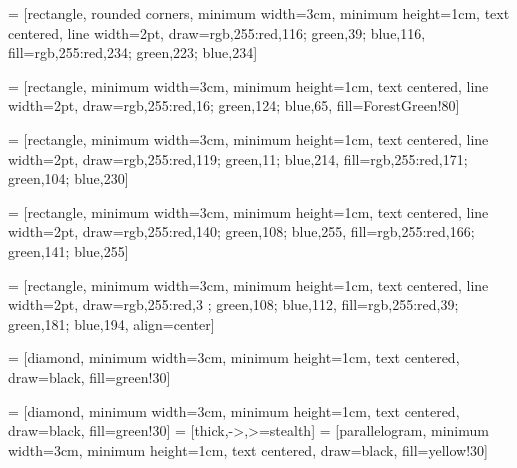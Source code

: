 {} = [rectangle, rounded corners, minimum width=3cm, minimum height=1cm, text centered, line width=2pt, draw={rgb,255:red,116; green,39; blue,116}, fill={rgb,255:red,234; green,223; blue,234}]

 = [rectangle, minimum width=3cm, minimum height=1cm, text centered, line width=2pt, draw={rgb,255:red,16; green,124; blue,65}, fill=ForestGreen!80]

 = [rectangle, minimum width=3cm, minimum height=1cm, text centered, line width=2pt, draw={rgb,255:red,119; green,11; blue,214}, fill={rgb,255:red,171; green,104; blue,230}]

 = [rectangle, minimum width=3cm, minimum height=1cm, text centered, line width=2pt, draw={rgb,255:red,140; green,108; blue,255}, fill={rgb,255:red,166; green,141; blue,255}]

 = [rectangle, minimum width=3cm, minimum height=1cm, text centered, line width=2pt, draw={rgb,255:red,3 ; green,108; blue,112}, fill={rgb,255:red,39; green,181; blue,194}, align=center]

 = [diamond, minimum width=3cm, minimum height=1cm, text centered, draw=black, fill=green!30]

 = [diamond, minimum width=3cm, minimum height=1cm, text centered, draw=black, fill=green!30]
 = [thick,->,>=stealth]
 = [parallelogram, minimum width=3cm, minimum height=1cm, text centered, draw=black, fill=yellow!30]

